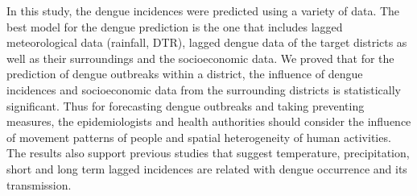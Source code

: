 \documentclass{bmcart}
\begin{document}
In this study, the dengue incidences were predicted using a variety of data. The best model for the dengue prediction is the one that includes lagged meteorological data (rainfall, DTR), lagged dengue data of the target districts as well as their surroundings and the socioeconomic data. We proved that for the prediction of dengue outbreaks within a district, the influence of dengue incidences and socioeconomic data from the surrounding districts is statistically significant. Thus for forecasting dengue outbreaks and taking preventing measures, the epidemiologists and health authorities should consider the influence of movement patterns of people and spatial heterogeneity of human activities. The results also support previous studies that suggest temperature, precipitation, short and long term lagged incidences are related with dengue occurrence and its transmission. 
\end{document}
